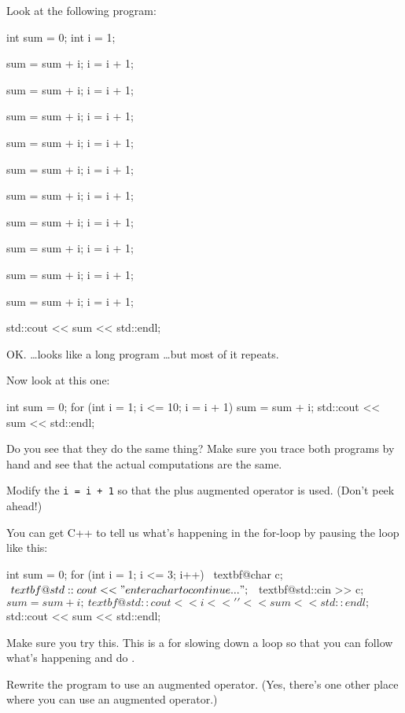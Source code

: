Look at the following program:
\begin{console}
int sum = 0;
int i = 1;

sum = sum + i;
i = i + 1;

sum = sum + i;
i = i + 1;

sum = sum + i;
i = i + 1;

sum = sum + i;
i = i + 1;

sum = sum + i;
i = i + 1;

sum = sum + i;
i = i + 1;

sum = sum + i;
i = i + 1;

sum = sum + i;
i = i + 1;

sum = sum + i;
i = i + 1;

sum = sum + i;
i = i + 1;

std::cout << sum << std::endl;
\end{console}

OK. \ldots looks like a long program \ldots but most of it repeats.

Now look at this one:
\begin{console}
int sum = 0;
for (int i = 1; i <= 10; i = i + 1)
{   
    sum = sum + i;
}
std::cout << sum << std::endl;
\end{console}

Do you see that they do the same thing? Make sure you trace both
programs by hand and see that the actual computations are the same.

\begin{ex}
Modify the \texttt{i = i + 1} so that the plus
augmented operator is used. (Don't peek ahead!)
\end{ex}
\begin{ex}
You can get C++ to tell us what's
happening in the for-loop by pausing the loop like this:
\begin{console}[commandchars=\~\@\$]
int sum = 0;
for (int i = 1; i <= 3; i++)
{   
     ~textbf@char c;$
     ~textbf@std::cout << "enter a char to continue ...";$
     ~textbf@std::cin >> c;$

     sum = sum + i;
     ~textbf@std::cout << i << ' ' << sum << std::endl;$
}
std::cout << sum << std::endl;
\end{console}
\end{ex}

Make sure you try this. This is a  for
slowing down a loop so that you can follow what's
happening and do .

\begin{ex}
 Rewrite the program to use an augmented operator.
(Yes, there's one other place where you can use an
augmented operator.)
\end{ex}

